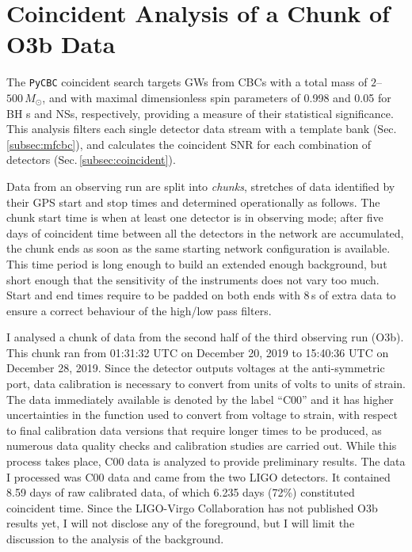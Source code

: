 \documentclass[binding=0.6cm, LaM]{sapthesis}
\begin{document}
\section{Coincident Analysis of a Chunk of O3b Data}
\label{sec:pycbc00}
	The {\texttt{PyCBC}} coincident search targets GWs from CBCs with a total mass of $2$--$500\,M_\odot$,
        and with maximal dimensionless spin parameters of 0.998 and 0.05 for BH s and NSs, respectively,
        providing a measure of their statistical significance.
        This analysis filters each single detector data stream with a template bank (Sec.\,\ref{subsec:mfcbc}),
        and calculates the coincident SNR for each combination of detectors (Sec.\,\ref{subsec:coincident}).

	Data from an observing run are split into \emph{chunks},
	stretches of data identified by their GPS start and stop times and
	determined operationally as follows.
	The chunk start time is when at least one detector is in observing mode;
	after five days of coincident time between all the detectors in the network are accumulated,
	the chunk ends as soon as the same starting network configuration is available.
        This time period is long enough to build an extended enough background, 
	but short enough that the sensitivity of the instruments does not vary too much. 
	Start and end times require to be padded on both ends with 8\,s of extra data 	
	to ensure a correct behaviour of the high/low pass filters.

        I analysed a chunk of data from the second half of the third observing run (O3b).  
	This chunk ran from 01:31:32 UTC on December 20, 2019 to 15:40:36 UTC on December 28, 2019.
	Since the detector outputs voltages at the anti-symmetric port, 
	data calibration is necessary to convert from units of volts to units of strain.
	The data immediately available is denoted by the label ``C00''  
	and it has higher uncertainties in the function used to convert from voltage to strain, 
	with respect to final calibration data versions that require longer times to be produced, as
        numerous data quality checks and calibration studies are carried out.
        While this process takes place, C00 data is analyzed to provide preliminary results.
	The data I processed was C00 data and came from the two LIGO detectors.
	It contained 8.59 days of raw calibrated data,
        of which 6.235 days (72\%) constituted coincident time.
        Since the LIGO-Virgo Collaboration has not published O3b results yet, 
	I will not disclose any of the foreground, but I will limit the discussion to the analysis of the background.
\end{document}
